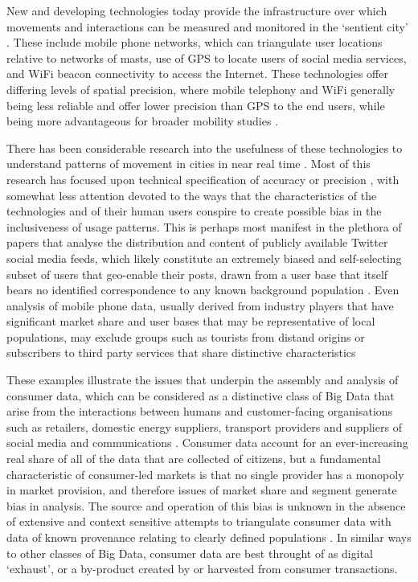 New and developing technologies today provide the infrastructure over which movements and interactions can be measured and monitored in the `sentient city' \citep{amin2017seeing}.
These include mobile phone networks, which can triangulate user locations relative to networks of masts, use of GPS to locate users of social media services, and WiFi beacon connectivity to access the Internet.
These technologies offer differing levels of spatial precision, where mobile telephony and WiFi generally being less reliable and offer lower precision than GPS to the end users, while being more advantageous for broader mobility studies \citep{pinelli2015comparing}.

There has been considerable research into the usefulness of these technologies to understand patterns of movement in cities in near real time \citep{candia2008uncovering, gonzalez2008understanding, calabrese2013understanding}. Most of this research has focused upon technical specification of accuracy or precision \citep{song2010limits, lane2010survey}, with somewhat less attention devoted to the ways that the characteristics of the technologies and of their human users conspire to create possible bias in the inclusiveness of usage patterns.
This is perhaps most manifest in the plethora of papers that analyse the distribution and content of publicly available Twitter social media feeds, which likely constitute an extremely biased and self-selecting subset of users that geo-enable their posts, drawn from a user base that itself bears no identified correspondence to any known background population \citep{lansley2016deriving}. 
Even analysis of mobile phone data, usually derived from industry players that have significant market share and user bases that may be representative of local populations, may exclude groups such as tourists from distand origins or subscribers to third party services that share distinctive characteristics \citep{di2016mind}

These examples illustrate the issues that underpin the assembly and analysis of consumer data, which can be considered as a distinctive class of Big Data that arise from the interactions between humans and customer-facing organisations such as retailers, domestic energy suppliers, transport providers and suppliers of social media and communications \citep{cdrc2018consumer}.
Consumer data account for an ever-increasing real share of all of the data that are collected of citizens, but a fundamental characteristic of consumer-led markets is that no single provider has a monopoly in market provision, and therefore issues of market share and segment generate bias in analysis.
The source and operation of this bias is unknown in the absence of extensive and context sensitive attempts to triangulate consumer data with data of known provenance relating to clearly defined populations \citep{lansley2016deriving}.
In similar ways to other classes of Big Data, consumer data are best throught of as digital ‘exhaust’, or a by-product created by or harvested from consumer transactions.

